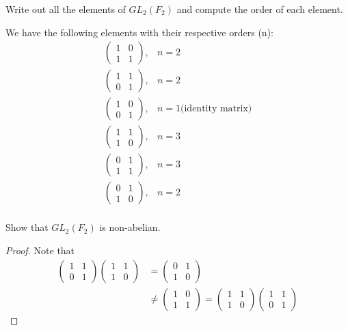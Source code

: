 \documentclass[12pt]{article}
\newenvironment{problem}[2][Problem]{\begin{trivlist} \item[\hskip \labelsep {\bfseries #1}\hskip \labelsep {\bfseries #2.}]}{\end{trivlist}}
\newenvironment{solution}[1][Solution]{\begin{trivlist} \item[\hskip \labelsep {\bfseries #1}]}{\end{trivlist}}
\begin{document}
\begin{problem}{2}
  Write out all the elements of $GL_{2}(F_{2})$ and compute the order of each element.
\begin{solution}
  We have the following elements with their respective orders (n):
\begin{align*}
\begin{pmatrix}
  1 & 0\\
  1 & 1
\end{pmatrix}, &n = 2\\
\begin{pmatrix}
  1 & 1\\
  0 & 1
\end{pmatrix}, &n = 2\\
\begin{pmatrix}
  1 & 0\\
  0 & 1
\end{pmatrix}, &n = 1 \text{(identity matrix)}\\
\begin{pmatrix}
  1 & 1\\
  1 & 0
\end{pmatrix}, &n = 3\\
\begin{pmatrix}
  0 & 1\\
  1 & 1
\end{pmatrix}, &n = 3\\
\begin{pmatrix}
  0 & 1\\
  1 & 0
\end{pmatrix}, &n = 2\\
\end{align*}
\end{solution}
\end{problem}
\begin{problem}{3}
  Show that $GL_{2}(F_{2})$ is non-abelian.
\begin{proof}
  Note that
\begin{align*}
\begin{pmatrix}1 & 1\\ 0 & 1\end{pmatrix} \begin{pmatrix} 1 & 1 \\ 1 & 0\end{pmatrix} &= \begin{pmatrix} 0 & 1\\ 1 & 0\end{pmatrix}\\
&\neq \begin{pmatrix} 1 & 0\\ 1 & 1\end{pmatrix} = \begin{pmatrix} 1 & 1\\ 1 & 0\end{pmatrix}\begin{pmatrix} 1 & 1\\ 0 & 1\end{pmatrix}
\end{align*}
\end{proof}
\end{problem}

       
\end{document}
